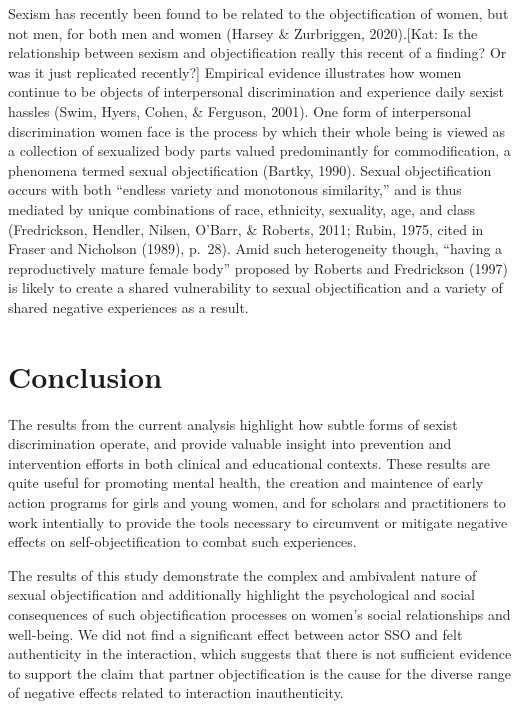 \documentclass[man]{apa6}
\begin{document}
Sexism has recently been found to be related to the objectification of
women, but not men, for both men and women (Harsey \& Zurbriggen,
2020).{[}Kat: Is the relationship between sexism and objectification
really this recent of a finding? Or was it just replicated recently?{]}
Empirical evidence illustrates how women continue to be objects of
interpersonal discrimination and experience daily sexist hassles (Swim,
Hyers, Cohen, \& Ferguson, 2001). One form of interpersonal
discrimination women face is the process by which their whole being is
viewed as a collection of sexualized body parts valued predominantly for
commodification, a phenomena termed sexual objectification (Bartky,
1990). Sexual objectification occurs with both \enquote{endless variety
and monotonous similarity,} and is thus mediated by unique combinations
of race, ethnicity, sexuality, age, and class (Fredrickson, Hendler,
Nilsen, O'Barr, \& Roberts, 2011; Rubin, 1975, cited in Fraser and
Nicholson (1989), p.~28). Amid such heterogeneity though,
\enquote{having a reproductively mature female body} proposed by Roberts
and Fredrickson (1997) is likely to create a shared vulnerability to
sexual objectification and a variety of shared negative experiences as a
result.

\section{Conclusion}\label{conclusion}

The results from the current analysis highlight how subtle forms of
sexist discrimination operate, and provide valuable insight into
prevention and intervention efforts in both clinical and educational
contexts. These results are quite useful for promoting mental health,
the creation and maintence of early action programs for girls and young
women, and for scholars and practitioners to work intentially to provide
the tools necessary to circumvent or mitigate negative effects on
self-objectification to combat such experiences.

The results of this study demonstrate the complex and ambivalent nature
of sexual objectification and additionally highlight the psychological
and social consequences of such objectification processes on women's
social relationships and well-being. We did not find a significant
effect between actor SSO and felt authenticity in the interaction, which
suggests that there is not sufficient evidence to support the claim that
partner objectification is the cause for the diverse range of negative
effects related to interaction inauthenticity.
\end{document}

